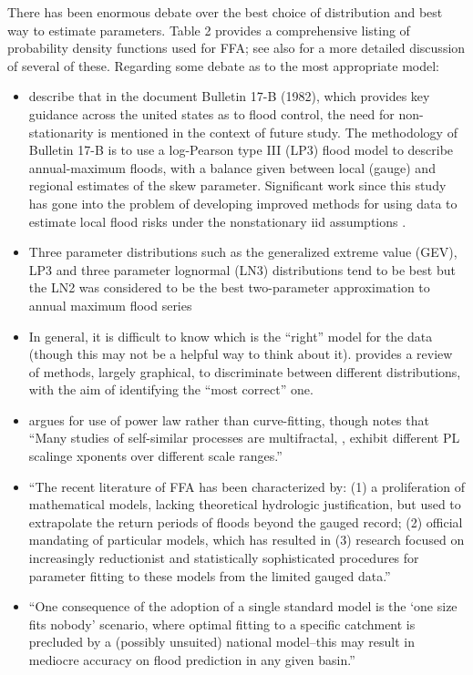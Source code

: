 \documentclass[11pt]{article}
\begin{document}
There has been enormous debate over the best choice of distribution and best way to estimate parameters.
\citet{Kidson2016} Table 2 provides a comprehensive listing of probability density functions used for FFA; see also \citet{Renard2006} for a more detailed discussion of several of these.
Regarding some debate as to the most appropriate model:
\begin{itemize}
  \item \citet{Raff2009} describe that in the document Bulletin 17-B (1982), which provides key guidance across the united states as to flood control, the need for non-stationarity is mentioned in the context of future study.
  The methodology of Bulletin 17-B is to use a log-Pearson type III (LP3) flood model to describe annual-maximum floods, with a balance given between local (gauge) and regional estimates of the skew parameter.
  Significant work since this study has gone into the problem of developing improved methods for using data to estimate local flood risks under the nonstationary {iid} assumptions \citep[see][for citations]{Raff2009}.
  \item Three parameter distributions such as the generalized extreme value (GEV), LP3 and three parameter lognormal (LN3) distributions tend to be best but the LN2 was considered to be the best two-parameter approximation to annual maximum flood series \citep{Vogel1996}
  \item In general, it is difficult to know which is the ``right'' model for the data (though this may not be a helpful way to think about it). \citet{Adlouni2008} provides a review of methods, largely graphical, to discriminate between different distributions, with the aim of identifying the ``most correct'' one.
  \item \citet{Kidson2016} argues for use of power law rather than curve-fitting, though notes that ``Many studies of self-similar processes are multifractal, \ie, exhibit different PL scalinge xponents over different scale ranges.''
  \item ``The recent literature of FFA has been characterized by: (1) a proliferation of mathematical models, lacking theoretical hydrologic justification, but used to extrapolate the return periods of floods beyond the gauged record; (2) official mandating of particular models, which has resulted in (3) research focused on increasingly reductionist and statistically sophisticated procedures for parameter fitting to these models from the limited gauged data.'' \citep{Kidson2016}
  \item ``One consequence of the adoption of a single standard model is the ‘one size fits nobody’ scenario, where optimal fitting to a specific catchment is precluded by a (possibly unsuited) national model–this may result in mediocre accuracy on flood prediction in any given basin.'' \citep{Kidson2016}

\end{itemize}
\end{document}
